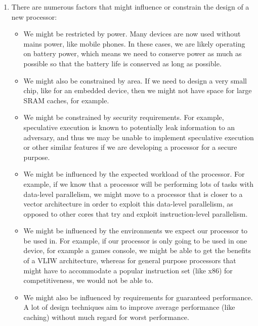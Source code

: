 


\begin{enumerate}[label=(\alph*)]
    \item
        There are numerous factors that might influence or constrain the design of a new processor:

        \begin{itemize}
            \item
                We might be restricted by power. Many devices are now used without mains power, like mobile phones. In these cases, we are likely operating on battery power, which means we need to conserve power as much as possible so that the battery life is conserved as long as possible.

            \item
                We might also be constrained by area. If we need to design a very small chip, like for an embedded device, then we might not have space for large SRAM caches, for example.

            \item
                We might be constrained by security requirements. For example, speculative execution is known to potentially leak information to an adversary, and thus we may be unable to implement speculative execution or other similar features if we are developing a processor for a secure purpose.

            \item
                We might be influenced by the expected workload of the processor. For example, if we know that a processor will be performing lots of tasks with data-level parallelism, we might move to a processor that is closer to a vector architecture in order to exploit this data-level parallelism, as opposed to other cores that try and exploit instruction-level parallelism.

            \item
                We might be influenced by the environments we expect our processor to be used in. For example, if our  processor is only going to be used in one device, for example a games console, we might be able to get the benefits of a VLIW architecture, whereas for general purpose processors that might have to accommodate a popular instruction set (like x86) for competitiveness, we would not be able to.

            \item
                We might also be influenced by requirements for guaranteed performance. A lot of design techniques aim to improve average performance (like caching) without much regard for worst performance.
        \end{itemize}


\end{enumerate}
